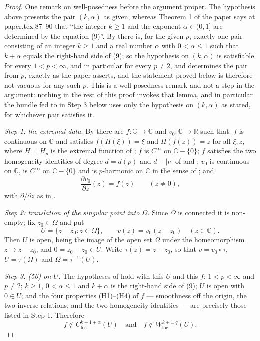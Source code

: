 \begin{proof}
One remark on well-posedness before the argument proper.  The hypothesis above
presents the pair $(k,\alpha)$ as given, whereas Theorem 1 of the paper says at
paper.tex:87--90 that ``the integer $k\ge1$ and the exponent $\alpha\in(0,1]$
are determined by the equation (9)''.  By  there is,
for the given $p$, exactly one pair consisting of an integer $k\ge1$ and a real
number $\alpha$ with $0<\alpha\le1$ such that $k+\alpha$ equals the right-hand
side of (9); so the hypothesis on $(k,\alpha)$ is satisfiable for every
$1<p<\infty$, and in particular for every $p\neq2$, and determines the pair from
$p$, exactly as the paper asserts, and the statement proved below is therefore
not vacuous for any such $p$.  This is a well-posedness remark and not a step in
the argument: nothing in the rest of this proof invokes that lemma, and in
particular the bundle fed to  in Step 3 below uses only
the hypothesis on $(k,\alpha)$ as stated, for whichever pair satisfies it.

\emph{Step 1: the extremal data.}  By  there
are $f\colon\mathbb{C}\to\mathbb{C}$ and $v_0\colon\mathbb{C}\to\mathbb{R}$ such
that: $f$ is continuous on $\mathbb{C}$ and satisfies $f(H(\xi))=\xi$ and
$H(f(z))=z$ for all $\xi,z$, where $H=H_p$ is the extremal function of
; $f$ is $C^\infty$ on $\mathbb{C}-\{0\}$; $f$ satisfies the
two homogeneity identities of degree $d=d(p)$ and $d-|\nu|$ of
 and ; $v_0$ is continuous on $\mathbb{C}$,
is $C^\infty$ on $\mathbb{C}-\{0\}$ and is $p$-harmonic on $\mathbb{C}$ in the
sense of ; and
\begin{equation}\tag{1}
  \frac{\partial v_0}{\partial z}(z)=f(z)\qquad(z\neq0),
\end{equation}
with $\partial/\partial z$ as in .

\emph{Step 2: translation of the singular point into $\Omega$.}  Since $\Omega$
is connected it is non-empty; fix $z_0\in\Omega$ and put
\[
  U=\{z-z_0:z\in\Omega\},\qquad v(z)=v_0(z-z_0)\quad(z\in\mathbb{C}).
\]
Then $U$ is open, being the image of the open set $\Omega$ under the
homeomorphism $z\mapsto z-z_0$, and $0=z_0-z_0\in U$.  Write
$\tau(z)=z-z_0$, so that $v=v_0\circ\tau$, $U=\tau(\Omega)$ and
$\Omega=\tau^{-1}(U)$.

\emph{Step 3: (56) on $U$.}  The hypotheses of  hold with
this $U$ and this $f$: $1<p<\infty$ and $p\neq2$; $k\ge1$, $0<\alpha\le1$ and
$k+\alpha$ is the right-hand side of (9); $U$ is open with $0\in U$; and the
four properties (H1)--(H4) of $f$ --- smoothness off the origin, the two
inverse relations, and the two homogeneity identities --- are precisely those
listed in Step 1.
Therefore
\begin{equation}\tag{2}
  f\notin C^{k-1+\alpha}_{\mathrm{loc}}(U)
  \quad\text{and}\quad
  f\notin W^{k+1,q}_{\mathrm{loc}}(U).
\end{equation}


\end{proof}

